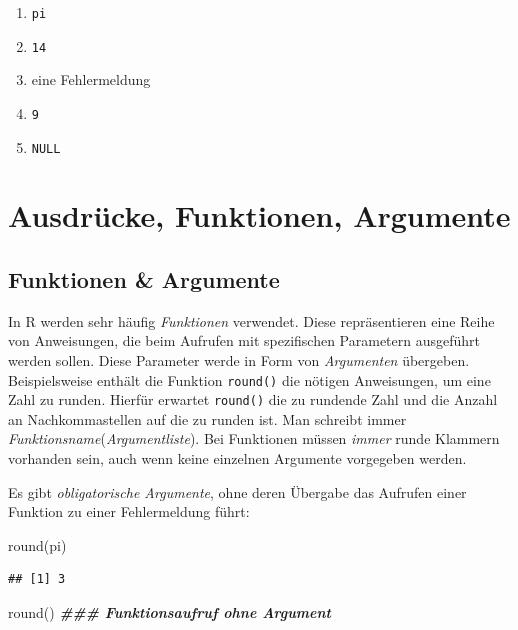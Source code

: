 \documentclass[
]{book}
\newenvironment{Shaded}{\begin{snugshade}}{\end{snugshade}}
\newcommand{\DocumentationTok}[1]{\textcolor[rgb]{0.56,0.35,0.01}{\textbf{\textit{#1}}}}
\newcommand{\FunctionTok}[1]{\textcolor[rgb]{0.00,0.00,0.00}{#1}}
\newcommand{\NormalTok}[1]{#1}
\providecommand{\tightlist}{%
  \setlength{\itemsep}{0pt}\setlength{\parskip}{0pt}}
\begin{document}
\begin{enumerate}
\def\labelenumi{\Alph{enumi})}
\tightlist
\item
  \texttt{pi}
\item
  \texttt{14}
\item
  eine Fehlermeldung
\item
  \texttt{9}
\item
  \texttt{NULL}
\end{enumerate}

\hypertarget{ausdruxfccke-funktionen-argumente}{%
\section{Ausdrücke, Funktionen, Argumente}\label{ausdruxfccke-funktionen-argumente}}

\hypertarget{funktionen-argumente}{%
\subsection*{Funktionen \& Argumente}\label{funktionen-argumente}}

In R werden sehr häufig \emph{Funktionen} verwendet. Diese repräsentieren eine Reihe von Anweisungen, die beim Aufrufen mit spezifischen Parametern ausgeführt werden sollen. Diese Parameter werde in Form von \emph{Argumenten} übergeben.
Beispielsweise enthält die Funktion \texttt{round()} die nötigen Anweisungen, um eine Zahl zu runden. Hierfür erwartet \texttt{round()} die zu rundende Zahl und die Anzahl an Nachkommastellen auf die zu runden ist.
Man schreibt immer \emph{Funktionsname}(\emph{Argumentliste}). Bei Funktionen müssen \emph{immer} runde Klammern vorhanden sein, auch wenn keine einzelnen Argumente vorgegeben werden.

Es gibt \emph{obligatorische Argumente}, ohne deren Übergabe das Aufrufen einer Funktion zu einer Fehlermeldung führt:
\scriptsize

\begin{Shaded}
\begin{Highlighting}[]
\FunctionTok{round}\NormalTok{(pi)}
\end{Highlighting}
\end{Shaded}

\begin{verbatim}
## [1] 3
\end{verbatim}

\begin{Shaded}
\begin{Highlighting}[]
\FunctionTok{round}\NormalTok{() }\DocumentationTok{\#\#\# Funktionsaufruf ohne Argument}
\end{Highlighting}
\end{Shaded}
\end{document}
